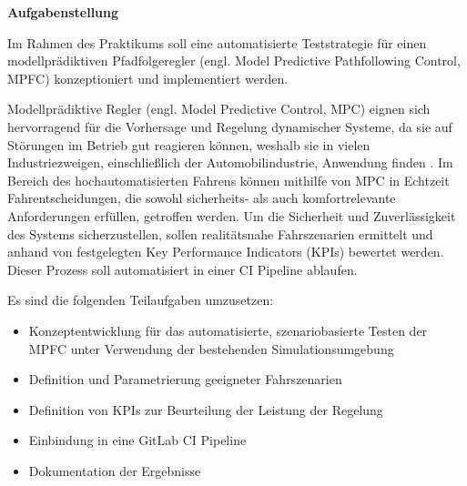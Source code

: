 \noindent\textbf{Aufgabenstellung}\smallskip

\noindent Im Rahmen des Praktikums soll eine automatisierte Teststrategie für einen modellprädiktiven Pfadfolgeregler (engl. Model Predictive Pathfollowing Control, MPFC) konzeptioniert und implementiert werden.

Modellprädiktive Regler (engl. Model Predictive Control, MPC) eignen sich hervorragend für die Vorhersage und Regelung dynamischer Systeme, da sie auf Störungen im Betrieb gut reagieren können, weshalb sie in vielen Industriezweigen, einschließlich der Automobilindustrie, Anwendung finden \cite{adamy2014}. Im Bereich des hochautomatisierten Fahrens können mithilfe von MPC in Echtzeit Fahrentscheidungen, die sowohl sicherheits- als auch komfortrelevante Anforderungen erfüllen, getroffen werden. Um die Sicherheit und Zuverlässigkeit des Systems sicherzustellen, sollen realitätsnahe Fahrszenarien ermittelt und anhand von festgelegten Key Performance Indicators (KPIs) bewertet werden. Dieser Prozess soll automatisiert in einer CI Pipeline ablaufen.\medskip

\noindent Es sind die folgenden Teilaufgaben umzusetzen:
\begin{itemize}
    \item Konzeptentwicklung für das automatisierte, szenariobasierte Testen der MPFC unter Verwendung der bestehenden Simulationsumgebung
    \item Definition und Parametrierung geeigneter Fahrszenarien
    \item Definition von KPIs zur Beurteilung der Leistung der Regelung
    \item Einbindung in eine GitLab CI Pipeline
    \item Dokumentation der Ergebnisse
\end{itemize}
